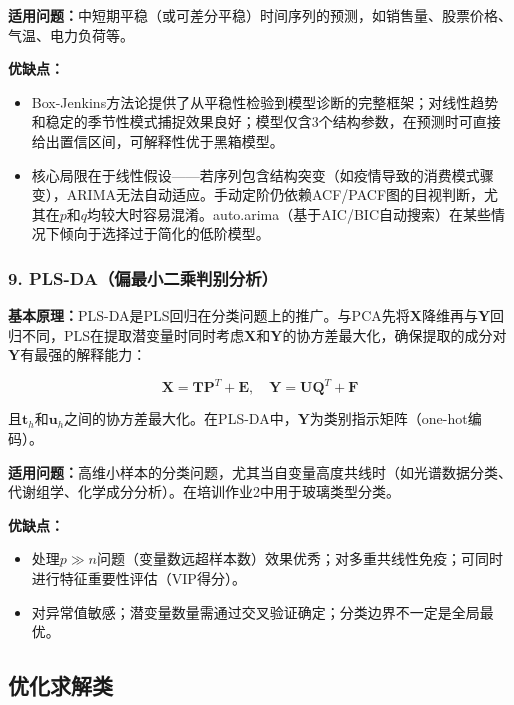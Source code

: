 \documentclass[12pt,a4paper]{ctexart}
\begin{document}
\textbf{适用问题：}中短期平稳（或可差分平稳）时间序列的预测，如销售量、股票价格、气温、电力负荷等。

\textbf{优缺点：}
\begin{itemize}[leftmargin=*]
    \item[+] Box-Jenkins方法论提供了从平稳性检验到模型诊断的完整框架；对线性趋势和稳定的季节性模式捕捉效果良好；模型仅含3个结构参数，在预测时可直接给出置信区间，可解释性优于黑箱模型。
    \item[$-$] 核心局限在于线性假设——若序列包含结构突变（如疫情导致的消费模式骤变），ARIMA无法自动适应。手动定阶仍依赖ACF/PACF图的目视判断，尤其在$p$和$q$均较大时容易混淆。auto.arima（基于AIC/BIC自动搜索）在某些情况下倾向于选择过于简化的低阶模型。
\end{itemize}

\subsubsection{9. PLS-DA（偏最小二乘判别分析）}

\textbf{基本原理：}PLS-DA是PLS回归在分类问题上的推广。与PCA先将$\mathbf{X}$降维再与$\mathbf{Y}$回归不同，PLS在提取潜变量时同时考虑$\mathbf{X}$和$\mathbf{Y}$的协方差最大化，确保提取的成分对$\mathbf{Y}$有最强的解释能力：

\begin{equation}
\mathbf{X} = \mathbf{T}\mathbf{P}^T + \mathbf{E}, \quad
\mathbf{Y} = \mathbf{U}\mathbf{Q}^T + \mathbf{F}
\end{equation}

且$\mathbf{t}_h$和$\mathbf{u}_h$之间的协方差最大化。在PLS-DA中，$\mathbf{Y}$为类别指示矩阵（one-hot编码）。

\textbf{适用问题：}高维小样本的分类问题，尤其当自变量高度共线时（如光谱数据分类、代谢组学、化学成分分析）。在培训作业2中用于玻璃类型分类。

\textbf{优缺点：}
\begin{itemize}[leftmargin=*]
    \item[+] 处理$p \gg n$问题（变量数远超样本数）效果优秀；对多重共线性免疫；可同时进行特征重要性评估（VIP得分）。
    \item[$-$] 对异常值敏感；潜变量数量需通过交叉验证确定；分类边界不一定是全局最优。
\end{itemize}

\subsection{优化求解类}
\end{document}
